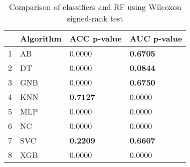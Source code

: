\begin{table}
\footnotesize
\caption{Comparison of classifiers and RF using Wilcoxon signed-rank test}
\label{tab:wilcoxon comparison}
\begin{tabular}{llll}
\hline
 & Algorithm & ACC p-value & AUC p-value \\
\hline
1 & AB & 0.0000 & \textbf{0.6705} \\
2 & DT & 0.0000 & \textbf{0.0844} \\
3 & GNB & 0.0000 & \textbf{0.6750} \\
4 & KNN & \textbf{0.7127} & 0.0000 \\
5 & MLP & 0.0000 & 0.0000 \\
6 & NC & 0.0000 & 0.0000 \\
7 & SVC & \textbf{0.2209} & \textbf{0.6607} \\
8 & XGB & 0.0000 & 0.0000 \\
\hline
\end{tabular}
\end{table}

